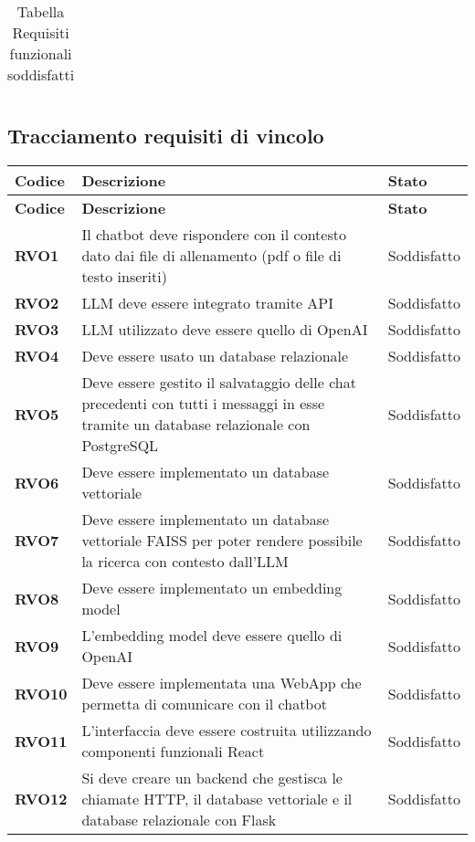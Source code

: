 \begin{longtable}{|>{\centering\arraybackslash}m{}|>{\centering\arraybackslash}m{}|>{\centering\arraybackslash}m{}|}
\caption{Tabella Requisiti funzionali soddisfatti}
\end{longtable}

\subsection{Tracciamento requisiti di vincolo}

\begin{longtable}{|>{\centering\arraybackslash}m{}|>{\centering\arraybackslash}m{}|>{\centering\arraybackslash}m{}|}
	\hline
	\textbf{Codice} & \textbf{Descrizione} & \textbf{Stato}\\\hline
	\endfirsthead
	\hline
	\textbf{Codice} & \textbf{Descrizione} & \textbf{Stato}\\\hline
	\endhead
    \hline
    \textbf{RVO1} & Il chatbot deve rispondere con il contesto dato dai file di allenamento (pdf o file di testo inseriti) & Soddisfatto \\
    \hline
    \textbf{RVO2} & LLM deve essere integrato tramite API & Soddisfatto \\
    \hline
    \textbf{RVO3} & LLM utilizzato deve essere quello di OpenAI & Soddisfatto \\
    \hline
    \textbf{RVO4} & Deve essere usato un database relazionale & Soddisfatto \\
    \hline
    \textbf{RVO5} & Deve essere gestito il salvataggio delle chat precedenti con tutti i messaggi in esse tramite un database relazionale con PostgreSQL & Soddisfatto \\
    \hline
    \textbf{RVO6} & Deve essere implementato un database vettoriale & Soddisfatto \\
    \hline
    \textbf{RVO7} & Deve essere implementato un database vettoriale FAISS per poter rendere possibile la ricerca con contesto dall'LLM & Soddisfatto \\
    \hline
    \textbf{RVO8} & Deve essere implementato un embedding model & Soddisfatto \\
    \hline
    \textbf{RVO9} & L'embedding model deve essere quello di OpenAI & Soddisfatto \\
    \hline
    \textbf{RVO10} & Deve essere implementata una WebApp che permetta di comunicare con il chatbot & Soddisfatto \\
    \hline
    \textbf{RVO11} & L’interfaccia deve essere costruita utilizzando componenti funzionali React & Soddisfatto \\
    \hline
    \textbf{RVO12} & Si deve creare un backend che gestisca le chiamate HTTP, il database vettoriale e il database relazionale con Flask & Soddisfatto \\

\end{longtable}
